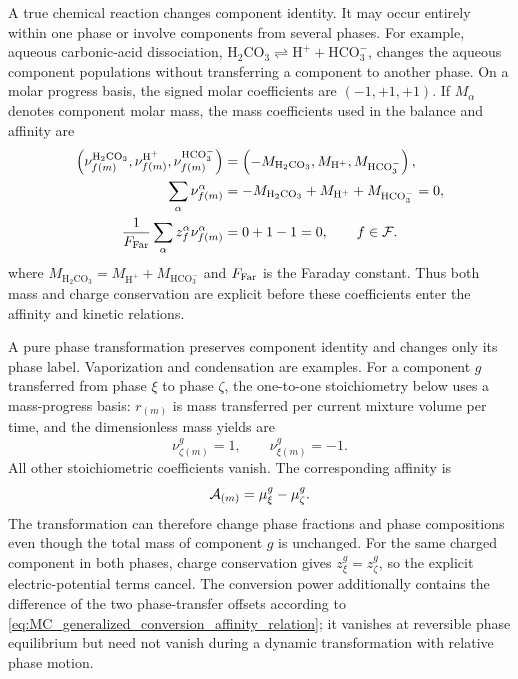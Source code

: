 A true chemical reaction changes component identity.  It may occur entirely
within one phase or involve components from several phases.  For example,
aqueous carbonic-acid dissociation,
\(\mathrm{H_2CO_3}\rightleftharpoons
\mathrm{H^+}+\mathrm{HCO_3^-}\), changes the aqueous component populations
without transferring a component to another phase.  On a molar progress basis,
the signed molar coefficients are \((-1,+1,+1)\).  If \(M_\alpha\) denotes
component molar mass, the mass coefficients used in the balance and affinity
are
%
\begin{align}
	\left(
	\nu_{f (m)}^{\mathrm{H_2CO_3}},
	\nu_{f (m)}^{\mathrm{H^+}},
	\nu_{f (m)}^{\mathrm{HCO_3^-}}
	\right)
	&=
	\left(
	-M_{\mathrm{H_2CO_3}},
	M_{\mathrm{H^+}},
	M_{\mathrm{HCO_3^-}}
	\right),
	\notag \\
	\sum_\alpha\nu_{f (m)}^\alpha
	&=
	-M_{\mathrm{H_2CO_3}}
	+
	M_{\mathrm{H^+}}
	+
	M_{\mathrm{HCO_3^-}}
	=0,
	\notag \\
	\frac{1}{F_{\rm Far}}
	\sum_\alpha
	z_f^\alpha\nu_{f (m)}^\alpha
	&=
	0+1-1
	=0,
	\qquad
	f\in\mathcal{F} .
	\label{eq:MC_carbonic_acid_mass_charge_checks}
\end{align}
%
where
\(M_{\mathrm{H_2CO_3}}=
M_{\mathrm{H^+}}+M_{\mathrm{HCO_3^-}}\) and \(F_{\rm Far}\) is the Faraday
constant.  Thus both mass and charge conservation are explicit before these
coefficients enter the affinity and kinetic relations.

A pure phase transformation preserves component identity and changes only its
phase label.  Vaporization and condensation are examples.  For a component
\(g\) transferred from phase \(\xi\) to phase \(\zeta\), the one-to-one
stoichiometry below uses a mass-progress basis: \(r_{(m)}\) is mass
transferred per current mixture volume per time, and the dimensionless mass
yields are
%
\begin{equation}
	\nu_{\zeta (m)}^g=1,
	\qquad
	\nu_{\xi (m)}^g=-1 .
	\label{eq:MC_one_to_one_transfer_stoichiometry}
\end{equation}
%
All other stoichiometric coefficients vanish.  The corresponding affinity is
%
\begin{equation}
	\mathcal{A}_{(m)}
	=
	\mu_\xi^g-\mu_\zeta^g .
	\label{eq:MC_one_to_one_transfer_affinity}
\end{equation}
%
The transformation can therefore change phase fractions and phase
compositions even though the total mass of component \(g\) is unchanged.  For
the same charged component in both phases, charge conservation gives
\(z_\xi^g=z_\zeta^g\), so the explicit electric-potential terms cancel.
The conversion power additionally contains the difference of the two
phase-transfer offsets according to
\eqref{eq:MC_generalized_conversion_affinity_relation}; it vanishes at
reversible phase equilibrium but need not vanish during a dynamic
transformation with relative phase motion.

